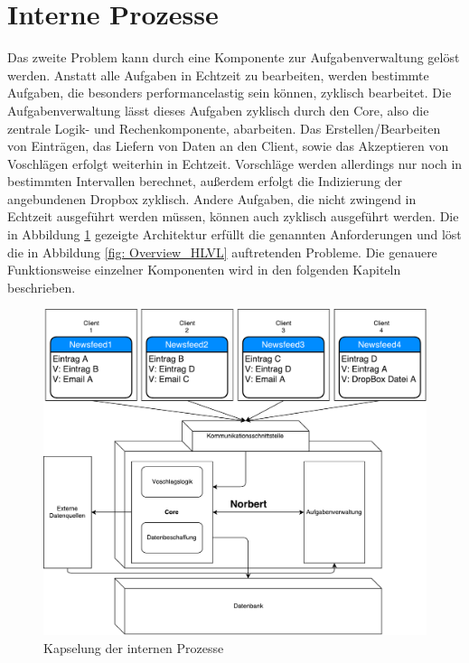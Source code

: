 \section{Interne Prozesse}

Das zweite Problem kann durch eine Komponente zur Aufgabenverwaltung gelöst werden. Anstatt alle Aufgaben in Echtzeit zu bearbeiten, werden bestimmte Aufgaben, die besonders performancelastig sein können, zyklisch bearbeitet. Die Aufgabenverwaltung lässt dieses Aufgaben zyklisch durch den Core, also die zentrale Logik- und Rechenkomponente, abarbeiten. Das Erstellen/Bearbeiten von Einträgen, das Liefern von Daten an den Client, sowie das Akzeptieren von Voschlägen erfolgt weiterhin in Echtzeit. Vorschläge werden allerdings nur noch in bestimmten Intervallen berechnet, außerdem erfolgt die Indizierung der angebundenen Dropbox zyklisch. Andere Aufgaben, die nicht zwingend in Echtzeit ausgeführt werden müssen, können auch zyklisch ausgeführt werden. Die in Abbildung \ref{fig: Overview_Detail} gezeigte Architektur erfüllt die genannten Anforderungen und löst die in Abbildung \ref{fig: Overview_HLVL} auftretenden Probleme. Die genauere Funktionsweise einzelner Komponenten wird in den folgenden Kapiteln beschrieben.

\begin{figure}[H]
\centering
\includegraphics[scale=0.6]{uml-diagramms/overview_detail.pdf}
\caption{Kapselung der internen Prozesse}
\label{fig: Overview_Detail}
\end{figure}




        
